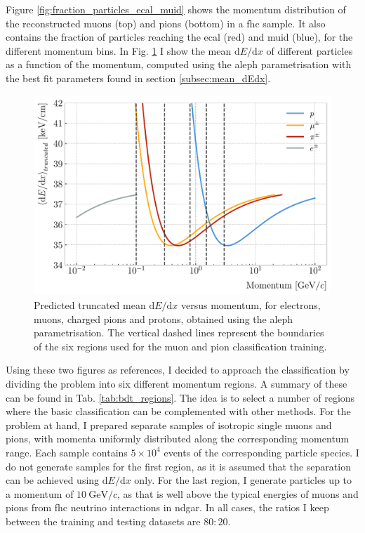 Figure \ref{fig:fraction_particles_ecal_muid} shows the momentum distribution of the reconstructed muons (top) and pions (bottom) in a \gls{fhc} sample. It also contains the fraction of particles reaching the \gls{ecal} (red) and \gls{muid} (blue), for the different momentum bins. In Fig. \ref{fig:dEdx_vs_momentum_regions} I show the mean $\mathrm{d}E/\mathrm{d}x$ of different particles as a function of the momentum, computed using the \gls{aleph} parametrisation with the best fit parameters found in section \ref{subsec:mean_dEdx}.

\begin{figure}[t]
	\centering
	\includegraphics[width=.80\linewidth]{Images/GArSoft_PID/BDT/dEdx_fit_only.pdf}
	\caption[Predicted truncated $\expval{\mathrm{d}E/\mathrm{d}x}$ versus momentum, for electrons, muons, charged pions and protons, obtained using the \gls{aleph} parametrisation]{Predicted truncated mean $\mathrm{d}E/\mathrm{d}x$ versus momentum, for electrons, muons, charged pions and protons, obtained using the \gls{aleph} parametrisation. The vertical dashed lines represent the boundaries of the six regions used for the muon and pion classification training.}
	\label{fig:dEdx_vs_momentum_regions}
\end{figure}

Using these two figures as references, I decided to approach the classification by dividing the problem into six different momentum regions. A summary of these can be found in Tab. \ref{tab:bdt_regions}. The idea is to select a number of regions where the basic classification can be complemented with other methods. For the problem at hand, I prepared separate samples of isotropic single muons and pions, with momenta uniformly distributed along the corresponding momentum range. Each sample contains $5 \times 10^{4}$ events of the corresponding particle species. I do not generate samples for the first region, as it is assumed that the separation can be achieved using $\mathrm{d}E/\mathrm{d}x$ only. For the last region, I generate particles up to a momentum of $10~\mathrm{GeV}/c$, as that is well above the typical energies of muons and pions from \gls{fhc} neutrino interactions in \gls{ndgar}. In all cases, the ratios I keep between the training and testing datasets are $80:20$.


